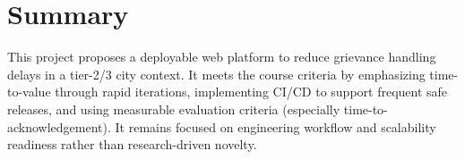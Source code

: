 \documentclass[11pt,a4paper]{article}
\begin{document}
\section{Summary}
This project proposes a deployable web platform to reduce grievance handling delays in a tier-2/3 city context. It meets the course criteria by emphasizing time-to-value through rapid iterations, implementing CI/CD to support frequent safe releases, and using measurable evaluation criteria (especially time-to-acknowledgement). It remains focused on engineering workflow and scalability readiness rather than research-driven novelty.
\end{document}
